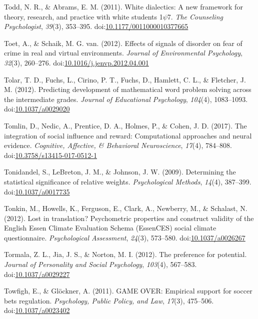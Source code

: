 \documentclass[english,man]{apa6}
\theoremstyle{definition}
\theoremstyle{definition}
\theoremstyle{definition}
\theoremstyle{remark}
\begin{document}
\hypertarget{ref-Todd2011a}{}
Todd, N. R., \& Abrams, E. M. (2011). White dialectics: A new framework
for theory, research, and practice with white students 1\(\psi\)7.
\emph{The Counseling Psychologist}, \emph{39}(3), 353--395.
doi:\href{https://doi.org/10.1177/0011000010377665}{10.1177/0011000010377665}

\hypertarget{ref-Toet2012}{}
Toet, A., \& Schaik, M. G. van. (2012). Effects of signals of disorder
on fear of crime in real and virtual environments. \emph{Journal of
Environmental Psychology}, \emph{32}(3), 260--276.
doi:\href{https://doi.org/10.1016/j.jenvp.2012.04.001}{10.1016/j.jenvp.2012.04.001}

\hypertarget{ref-Tolar2012}{}
Tolar, T. D., Fuchs, L., Cirino, P. T., Fuchs, D., Hamlett, C. L., \&
Fletcher, J. M. (2012). Predicting development of mathematical word
problem solving across the intermediate grades. \emph{Journal of
Educational Psychology}, \emph{104}(4), 1083--1093.
doi:\href{https://doi.org/10.1037/a0029020}{10.1037/a0029020}

\hypertarget{ref-Tomlin2017}{}
Tomlin, D., Nedic, A., Prentice, D. A., Holmes, P., \& Cohen, J. D.
(2017). The integration of social influence and reward: Computational
approaches and neural evidence. \emph{Cognitive, Affective, \&
Behavioral Neuroscience}, \emph{17}(4), 784--808.
doi:\href{https://doi.org/10.3758/s13415-017-0512-1}{10.3758/s13415-017-0512-1}

\hypertarget{ref-Tonidandel2009}{}
Tonidandel, S., LeBreton, J. M., \& Johnson, J. W. (2009). Determining
the statistical significance of relative weights. \emph{Psychological
Methods}, \emph{14}(4), 387--399.
doi:\href{https://doi.org/10.1037/a0017735}{10.1037/a0017735}

\hypertarget{ref-Tonkin2012}{}
Tonkin, M., Howells, K., Ferguson, E., Clark, A., Newberry, M., \&
Schalast, N. (2012). Lost in translation? Psychometric properties and
construct validity of the English Essen Climate Evaluation Schema
(EssenCES) social climate questionnaire. \emph{Psychological
Assessment}, \emph{24}(3), 573--580.
doi:\href{https://doi.org/10.1037/a0026267}{10.1037/a0026267}

\hypertarget{ref-Tormala2012}{}
Tormala, Z. L., Jia, J. S., \& Norton, M. I. (2012). The preference for
potential. \emph{Journal of Personality and Social Psychology},
\emph{103}(4), 567--583.
doi:\href{https://doi.org/10.1037/a0029227}{10.1037/a0029227}

\hypertarget{ref-Towfigh2011}{}
Towfigh, E., \& Glöckner, A. (2011). GAME OVER: Empirical support for
soccer bets regulation. \emph{Psychology, Public Policy, and Law},
\emph{17}(3), 475--506.
doi:\href{https://doi.org/10.1037/a0023402}{10.1037/a0023402}
\end{document}
